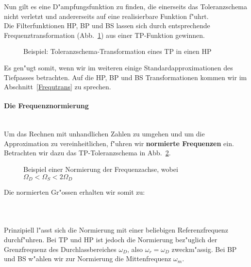  Nun gilt es eine D"ampfungsfunktion zu finden, die einerseits das
Toleranzschema nicht verletzt und andererseits auf eine realisierbare
Funktion f"uhrt.\\ Die Filterfunktionen HP, BP und BS lassen sich
durch entsprechende Frequenztransformation (Abb.~\ref{bsb tp-hp}) aus
einer TP-Funktion gewinnen.
\begin{figure}[!htb]
\begin{center}
  \vspace*{-3mm}\caption{Beispiel: Toleranzschema-Transformation eines TP in einen HP \label{bsb tp-hp}}
\end{center}
\vspace*{-6mm}
\end{figure}
Es gen"ugt somit, wenn wir im weiteren einige Standardapproximationen des
Tiefpasses betrachten. Auf die HP, BP und BS Transformationen kommen wir im
Abschnitt~\ref{Frequtrans} zu sprechen.
\paragraph{Die Frequenznormierung}~\\
Um das Rechnen mit unhandlichen Zahlen zu umgehen und um die
Approximation zu vereinheitlichen, f"uhren wir {\bf normierte Frequenzen}
ein.  Betrachten wir dazu das TP-Toleranzschema in Abb.~\ref{norm}.
\begin{figure}[!htb]
\vspace*{-1mm}
\begin{center}
  \vspace*{-3mm}\caption{Beispiel einer Normierung der Frequenzachse, wobei $\Omega_{D}<\Omega_{S}<2\Omega_{D}$\label{norm}}
\end{center}
\vspace*{-6mm}
\end{figure}
Die normierten Gr"ossen erhalten wir somit zu:\\~\\
~\\~\\
\nit Prinzipiell l"asst sich die Normierung mit einer beliebigen
Referenzfrequenz durch\-f"uh\-ren. Bei TP und HP ist jedoch die
Normierung bez"uglich der Grenzfrequenz des Durchlassbereiches
$\omega_{D}$, also $\omega_{r}=\omega_{D}$ zweckm"assig. Bei BP und
BS w"ahlen wir zur Normierung die Mittenfrequenz $\omega_{m}$. {\bf{}}
